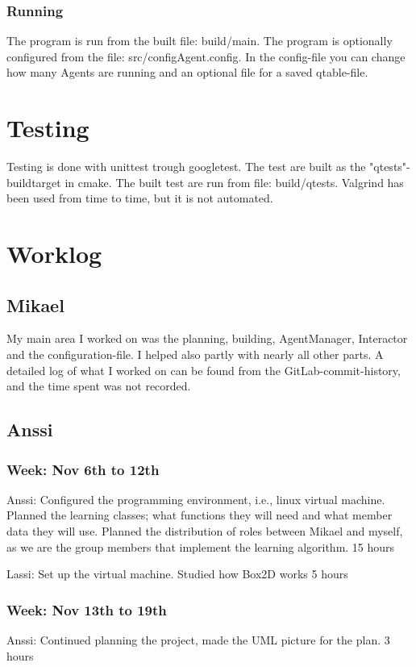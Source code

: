 \documentclass{article}
\begin{document}
\subsubsection{Running}
The program is run from the built file: build/main.
The program is optionally configured from the file: src/configAgent.config.
In the config-file you can change how many Agents are running and
an optional file for a saved qtable-file.


\section{Testing}
Testing is done with unittest trough googletest.
The test are built as the "qtests"-buildtarget in cmake.
The built test are run from file: build/qtests.
Valgrind has been used from time to time, but it is not automated.


\section{Worklog}

\subsection{Mikael}
My main area I worked on was the planning, building, AgentManager,
Interactor and the configuration-file. I helped also partly with nearly all
other parts.
A detailed log of what I worked on can be found from the GitLab-commit-history,
and the time spent was not recorded.

\subsection{Anssi}
\subsubsection{Week: Nov 6th to 12th}
Anssi:
Configured the programming environment, i.e., linux virtual machine.
Planned the learning classes; what functions they will need and what
member data they will use. Planned the distribution of roles between
Mikael and myself, as we are the group members that implement the learning
algorithm.
15 hours

Lassi:
Set up the virtual machine. Studied how Box2D works
5 hours

\subsubsection{Week: Nov 13th to 19th}
Anssi:
Continued planning the project, made the UML picture for the plan.
3 hours
\end{document}
